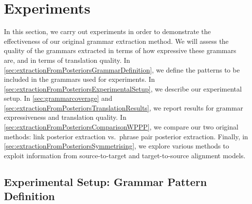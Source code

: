 \section{Experiments}
\label{sec:extractionFromPosteriorsExperiments}

In this section, we carry out experiments in order to demonstrate
the effectiveness of our original grammar extraction method. We will
assess the quality of the grammars extracted in terms of how expressive
these grammars are, and in terms of translation quality.
In \autoref{sec:extractionFromPosteriorsGrammarDefinition}, we
define the patterns to be included in the grammars used for experiments.
In \autoref{sec:extractionFromPosteriorsExperimentalSetup}, we describe
our experimental setup. In \autoref{sec:grammarcoverage} and
\autoref{sec:extractionFromPosteriorsTranslationResults}, we report
results for grammar expressiveness and translation quality.
In \autoref{sec:extractionFromPosteriorsComparisonWPPP}, we compare
our two original methods: link posterior extraction vs.\ phrase pair posterior
extraction. Finally, in \autoref{sec:extractionFromPosteriorsSymmetrising},
we explore various methods to exploit information from source-to-target and
target-to-source alignment models.

\subsection{Experimental Setup: Grammar Pattern Definition}
\label{sec:extractionFromPosteriorsGrammarDefinition}

